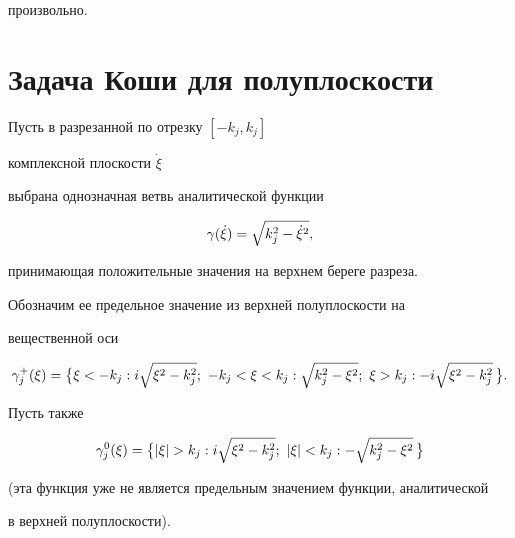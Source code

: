 произвольно.





\section{Задача Коши для полуплоскости}





Пусть в разрезанной по отрезку $[-k_j,k_j]$


комплексной плоскости $\Dot{\xi}$


выбрана однозначная ветвь аналитической функции


$$


\ga(\Dot{\xi}) = \sqrt{k_j^2-\Dot{\xi}^2} ,


$$


принимающая положительные значения на верхнем береге разреза.


Обозначим ее предельное значение из верхней полуплоскости на


вещественной оси


$$


\gaxi{j} = \big\{


\xi< -k_j : i\sqrt{\xi^2-k_j^2};


\ -k_j< \xi< k_j :  \sqrt{k_j^2-\xi^2};


\ \xi> k_j : -i\sqrt{\xi^2-k_j^2}\,\big\} .


$$


Пусть также


$$


\gaoxi{j} = \big\{


|\xi| > k_j : i\sqrt{\xi^2-k_j^2};


\ |\xi| < k_j : -\sqrt{k_j^2-\xi^2}\,\big\}


$$


(эта функция уже не является предельным значением функции, аналитической


в верхней полуплоскости).





